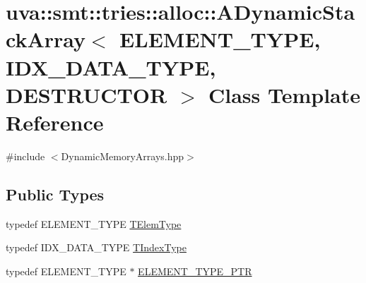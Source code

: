 \hypertarget{classuva_1_1smt_1_1tries_1_1alloc_1_1_a_dynamic_stack_array}{}\section{uva\+:\+:smt\+:\+:tries\+:\+:alloc\+:\+:A\+Dynamic\+Stack\+Array$<$ E\+L\+E\+M\+E\+N\+T\+\_\+\+T\+Y\+P\+E, I\+D\+X\+\_\+\+D\+A\+T\+A\+\_\+\+T\+Y\+P\+E, D\+E\+S\+T\+R\+U\+C\+T\+O\+R $>$ Class Template Reference}
\label{classuva_1_1smt_1_1tries_1_1alloc_1_1_a_dynamic_stack_array}


{\ttfamily \#include $<$Dynamic\+Memory\+Arrays.\+hpp$>$}

\subsection*{Public Types}
\begin{DoxyCompactItemize}
\item 
typedef E\+L\+E\+M\+E\+N\+T\+\_\+\+T\+Y\+P\+E \hyperlink{classuva_1_1smt_1_1tries_1_1alloc_1_1_a_dynamic_stack_array_a652b4bc4c3325566b346706e586815bd}{T\+Elem\+Type}
\item 
typedef I\+D\+X\+\_\+\+D\+A\+T\+A\+\_\+\+T\+Y\+P\+E \hyperlink{classuva_1_1smt_1_1tries_1_1alloc_1_1_a_dynamic_stack_array_ae920c6bccc4c1b70d816f016967bbe08}{T\+Index\+Type}
\item 
typedef E\+L\+E\+M\+E\+N\+T\+\_\+\+T\+Y\+P\+E $\ast$ \hyperlink{classuva_1_1smt_1_1tries_1_1alloc_1_1_a_dynamic_stack_array_a4263e8993e4292ecaa29058ae23ef9cd}{E\+L\+E\+M\+E\+N\+T\+\_\+\+T\+Y\+P\+E\+\_\+\+P\+T\+R}
\end{DoxyCompactItemize}
